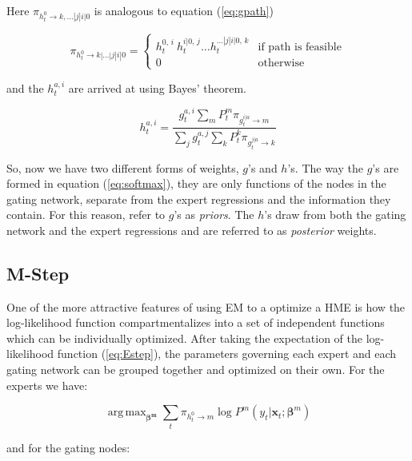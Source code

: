 \documentclass[12pt]{article}
\newcommand{\gateprod}[2]{\pi_{#1 \longrightarrow #2}}
\newcommand{\shortsum}[1]{\sum \nolimits_{#1}}
\newcommand{\h}[2]{h^{#1}_{#2}}
\DeclareMathOperator*{\argmax}{arg\,max}
\theoremstyle{definition}
\begin{document}
Here $\gateprod{h^{0}_{t}}{k,\dots|j|i|0}$ is analogous to equation (\ref{eq:gpath})

\begin{equation} \label{eq:hpath}
  \gateprod{h^{0}_{t}}{k|\ldots|j|i|0} =
    \begin{cases} 
       h^{0, \, i}_{t} \ h^{i|0, \, j}_{t} \ldots h^{\dots|j|i|0, \, k}_{t} & \textrm{if path is feasible} \\
       0 & \textrm{otherwise}
    \end{cases}
\end{equation}

and the $h^{a, i}_{t}$ are arrived at using Bayes' theorem.

\begin{equation} \label{eq:posteriornode}
  \h{a,i}{t} = \frac{g^{a, i}_{t} \shortsum{m} P^{m}_{t} \gateprod{g^{i|a}_{t}}{m}}{\shortsum{j} g^{a, j}_{t} \shortsum{k} P^{k}_{t} \gateprod{g^{j|a}_{t}}{k}}
\end{equation}


So, now we have two different forms of weights, $g$'s and $h$'s. The way the $g$'s are formed in equation (\ref{eq:softmax}), they are only functions of the nodes in the gating network, separate from the expert regressions and the information they contain. For this reason, \citet{JordanJacobs1993} refer to $g$'s as \textit{priors}. The $h$'s draw from both the gating network and the expert regressions and are referred to as \textit{posterior} weights.


\subsection{M-Step} \label{sec:Mstep}

One of the more attractive features of using EM to a optimize a HME is how the log-likelihood function compartmentalizes into a set of independent functions which can be individually optimized. After taking the expectation of the log-likelihood function (\ref{eq:Estep}), the parameters governing each expert and each gating network can be grouped together and optimized on their own. For the experts we have:

\begin{equation} \label{eq:BetaUpdate}
  \argmax_{\boldsymbol{\beta^{m}}} \sum_{t} \gateprod{h^{0}_{t}}{m} \log P^{m} (y_{t}| \boldsymbol{x}_{t}; \boldsymbol{\beta}^{m})
\end{equation}

and for the gating nodes:
\end{document}
